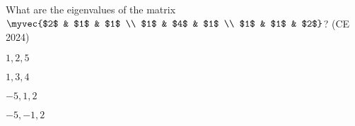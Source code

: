 \item What are the eigenvalues of the matrix  
	$
\myvec{$2$ & $1$ & $1$ \\ $1$ & $4$ & $1$ \\ $1$ & $1$ & $2$} 
$?
\hfill (CE  2024)
\begin{enumerate}
\begin{multicols}{4}
\item $1,2,5$
\item $1,3,4$
\item $-5,1,2$
\item $-5,-1,2$
\end{multicols}
\end{enumerate}
